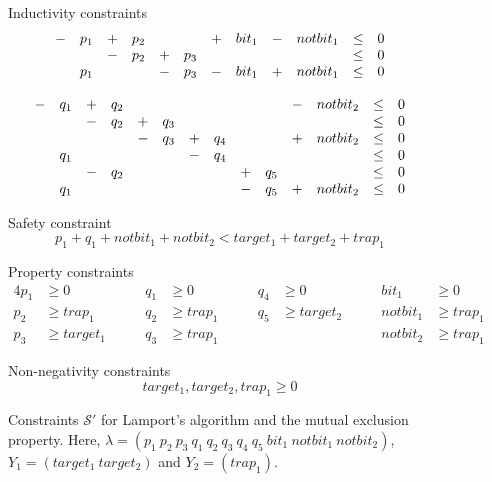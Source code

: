 \begin{figure}[t]
Inductivity constraints
$$
\begin{array}[t]{clclclclclcl}
    -  & p_1 &  +  & p_2 &     &     &  +  & bit_1 &  -  & notbit_1 &  \le  & 0 \\
       &     &  -  & p_2 &  +  & p_3 &     &       &     &          &  \le  & 0 \\
       & p_1 &     &     &  -  & p_3 &  -  & bit_1 &  +  & notbit_1 &  \le  & 0
\end{array}
$$

$$
\begin{array}[t]{clclclclclclclclclcl}
    -  & q_1 &  +  & q_2 &     &     &     &     &     &     &  -  & notbit_2 &  \le  & 0  \\
       &     &  -  & q_2 &  +  & q_3 &     &     &     &     &     &          &  \le  & 0  \\
       &     &     &     &  -  & q_3 &  +  & q_4 &     &     &  +  & notbit_2 &  \le  & 0  \\
       & q_1 &     &     &     &     &  -  & q_4 &     &     &     &          &  \le  & 0  \\
       &     &  -  & q_2 &     &     &     &     &  +  & q_5 &     &          &  \le  & 0  \\
       & q_1 &     &     &     &     &     &     &  -  & q_5 &  +  & notbit_2 &  \le  & 0 
\end{array}
$$

Safety constraint
$$    
p_1 + q_1 + notbit_1 + notbit_2 < target_1 + target_2 + trap_1
$$

Property constraints
\begin{alignat*}{4}
  p_1 & \ge 0 & \qquad q_1 & \ge 0 & \qquad q_4 & \ge 0 & \qquad bit_1 & \ge 0  \\
  p_2 & \ge trap_1 & \qquad q_2 & \ge trap_1 & \qquad q_5 & \ge target_2& \qquad notbit_1 & \ge trap_1 \\
  p_3 & \ge target_1  & \qquad q_3 & \ge trap_1 & & & \qquad notbit_2 & \ge trap_1
\end{alignat*}

Non-negativity constraints
$$
  target_1, target_2, trap_1 \ge 0
$$

\caption[Constraints $\mathcal{S}'$ for Lamport's
    algorithm and the mutual exclusion property.]
    {Constraints $\mathcal{S}'$ for Lamport's
algorithm and the mutual exclusion property. Here, $\lambda=(p_1\ p_2\
p_3\ q_1\ q_2\ q_3\ q_4\ q_5\ bit_1\ notbit_1\ notbit_2)$,
$Y_1=(target_1\ target_2)$ and $Y_2=(trap_1)$.}
\label{fig:example-constraints}
\end{figure}

